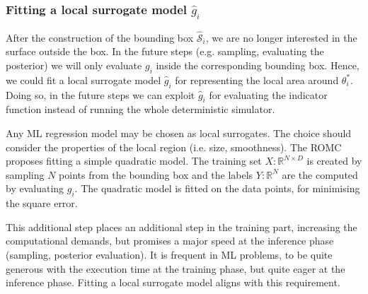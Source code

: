 \subsubsection*{Fitting a local surrogate model $\hat{g}_i$}

After the construction of the bounding box $\mathcal{\hat{S}}_i$, we
are no longer interested in the surface outside the box. In the future
steps (e.g. sampling, evaluating the posterior) we will only evaluate
$g_i$ inside the corresponding bounding box. Hence, we could fit a
local surrogate model $\hat{g}_i$ for representing the local area
around $\theta_i^*$. Doing so, in the future steps we can exploit
$\hat{g}_i$ for evaluating the indicator function instead of running
the whole deterministic simulator.

Any ML regression model may be chosen as local surrogates. The choice
should consider the properties of the local region (i.e. size,
smoothness). The ROMC proposes fitting a simple quadratic model. The
training set $X: \mathbb{R}^{N \times D}$ is created by sampling $N$
points from the bounding box and the labels $Y: \mathbb{R}^{N}$ are
the computed by evaluating $g_i$. The quadratic model is fitted on the
data points, for minimising the square error.


This additional step places an
additional step in the training part, increasing the computational
demands, but promises a major speed at the inference phase (sampling,
posterior evaluation). It is frequent in ML problems, to be quite
generous with the execution time at the training phase, but quite
eager at the inference phase. Fitting a local surrogate model aligns
with this requirement.
